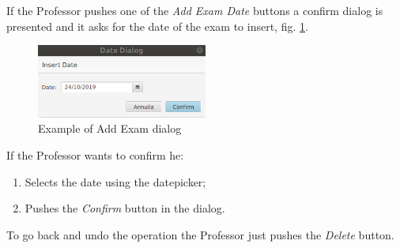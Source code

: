 \documentclass{report}
\begin{document}
If the Professor pushes one of the \textit{Add Exam Date} buttons a confirm dialog is presented and it asks for the date of the exam to insert, fig. \ref{fig:AddExamDialog}.
\begin{figure} [h!]
	\centering
	\includegraphics[width=0.5\textwidth]{AddExamDialog.png}
	\caption{Example of Add Exam dialog}
	\label{fig:AddExamDialog}
\end{figure} 
If the Professor wants to confirm he:
\begin{enumerate}
	\item Selects the date using the datepicker;
	\item Pushes the \textit{Confirm} button in the dialog.
\end{enumerate}
To go back and undo the operation the Professor just pushes the \textit{Delete} button.
\end{document}
